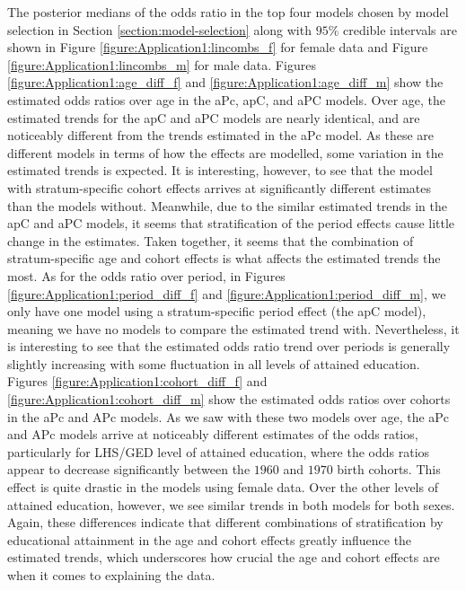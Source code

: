 \vspace{-0.2cm}
The posterior medians of the odds ratio in the top four models chosen by model selection in Section \ref{section:model-selection} along with $95\%$ credible intervals are shown in Figure \ref{figure:Application1:lincombs_f} for female data and Figure \ref{figure:Application1:lincombs_m} for male data. Figures \ref{figure:Application1:age_diff_f} and \ref{figure:Application1:age_diff_m} show the estimated odds ratios over age in the aPc, apC, and aPC models. Over age, the estimated trends for the apC and aPC models are nearly identical, and are noticeably different from the trends estimated in the aPc model. As these are different models in terms of how the effects are modelled, some variation in the estimated trends is expected. It is interesting, however, to see that the model with stratum-specific cohort effects arrives at significantly different estimates than the models without. Meanwhile, due to the similar estimated trends in the apC and aPC models, it seems that stratification of the period effects cause little change in the estimates. Taken together, it seems that the combination of stratum-specific age and cohort effects is what affects the estimated trends the most. As for the odds ratio over period, in Figures \ref{figure:Application1:period_diff_f} and \ref{figure:Application1:period_diff_m}, we only have one model using a stratum-specific period effect (the apC model), meaning we have no models to compare the estimated trend with. Nevertheless, it is interesting to see that the estimated odds ratio trend over periods is generally slightly increasing with some fluctuation in all levels of attained education. Figures \ref{figure:Application1:cohort_diff_f} and \ref{figure:Application1:cohort_diff_m} show the estimated odds ratios over cohorts in the aPc and APc models. As we saw with these two models over age, the aPc and APc models arrive at noticeably different estimates of the odds ratios, particularly for LHS/GED level of attained education, where the odds ratios appear to decrease significantly between the $1960$ and $1970$ birth cohorts. This effect is quite drastic in the models using female data. Over the other levels of attained education, however, we see similar trends in both models for both sexes. Again, these differences indicate that different combinations of stratification by educational attainment in the age and cohort effects greatly influence the estimated trends, which underscores how crucial the age and cohort effects are when it comes to explaining the data.

